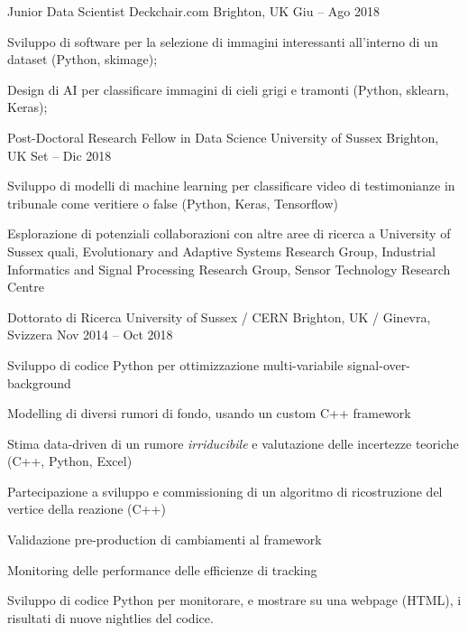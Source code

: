 \begin{cventries}
    \cventry
    {Junior Data Scientist}
    {Deckchair.com}
    {Brighton, UK}
    {Giu -- Ago 2018}
    {
      \begin{cvitems}
        \item Sviluppo di software per la selezione di immagini interessanti all'interno di un dataset (Python, skimage);
        \item Design di AI per classificare immagini di cieli grigi e tramonti (Python, sklearn, Keras);
      \end{cvitems}
    }
  \end{cventries}

  \begin{cventries}
    \cventry
    {Post-Doctoral Research Fellow in Data Science}
    {University of Sussex}
    {Brighton, UK}
    {Set -- Dic 2018}
    {
      \begin{cvitems}
        \item Sviluppo di modelli di machine learning per classificare video di testimonianze in tribunale come veritiere o false (Python, Keras, Tensorflow)
        \item Esplorazione di potenziali collaborazioni con altre aree di ricerca a University of Sussex quali, Evolutionary and Adaptive Systems Research Group, Industrial Informatics and Signal Processing Research Group, Sensor Technology Research Centre
      \end{cvitems}
    }
  \end{cventries}

  \begin{cventries}    
    \cventry
    {Dottorato di Ricerca}
    {University of Sussex / CERN}
    {Brighton, UK / Ginevra, Svizzera}
    {Nov 2014 -- Oct 2018}
    {
    \begin{cvitems}
      \item Sviluppo di codice Python per ottimizzazione multi-variabile signal-over-background 
      \item Modelling di diversi rumori di fondo, usando un custom C++ framework
      \item Stima data-driven di un rumore \emph{irriducibile} e valutazione delle incertezze teoriche (C++, Python, Excel)
      \item Partecipazione a sviluppo e commissioning di un algoritmo di ricostruzione del vertice della reazione (C++)
      \item Validazione pre-production di cambiamenti al framework
      \item Monitoring delle performance delle efficienze di tracking
      \item Sviluppo di codice Python per monitorare, e mostrare su una webpage (HTML), i risultati di nuove nightlies del codice.
    \end{cvitems}
    }
  \end{cventries}

